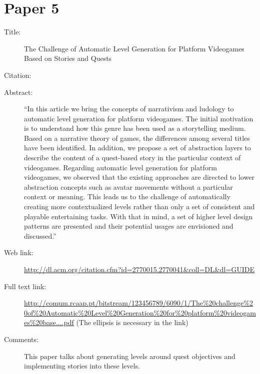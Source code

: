\documentclass{scrartcl}
\begin{document}
\section*{Paper 5}
\begin{description}
\item[Title:] The Challenge of Automatic Level Generation for Platform Videogames Based on Stories and Quests
\item[Citation:] \cite{Mourato}
\item[Abstract:] ``In this article we bring the concepts of narrativism and ludology to automatic level generation for platform videogames. The initial motivation is to understand how this genre has been used as a storytelling medium. Based on a narrative theory of games, the differences among several titles have been identified. In addition, we propose a set of abstraction layers to describe the content of a quest-based story in the particular context of videogames. Regarding automatic level generation for platform videogames, we observed that the existing approaches are directed to lower abstraction concepts such as avatar movements without a particular context or meaning. This leads us to the challenge of automatically creating more contextualized levels rather than only a set of consistent and playable entertaining tasks. With that in mind, a set of higher level design patterns are presented and their potential usages are envisioned and discussed.''
\item[Web link:] \url{http://dl.acm.org/citation.cfm?id=2770015.2770041&coll=DL&dl=GUIDE}
\item[Full text link:] \url{http://comum.rcaap.pt/bitstream/123456789/6090/1/The\%20challenge\%20of\%20Automatic\%20Level\%20Generation\%20for\%20platform\%20videogames\%20base....pdf} (The ellipsis is necessary in the link)
\item[Comments:] This paper talks about generating levels around quest objectives and implementing stories into these levels.
\end{description}



\end{document}
